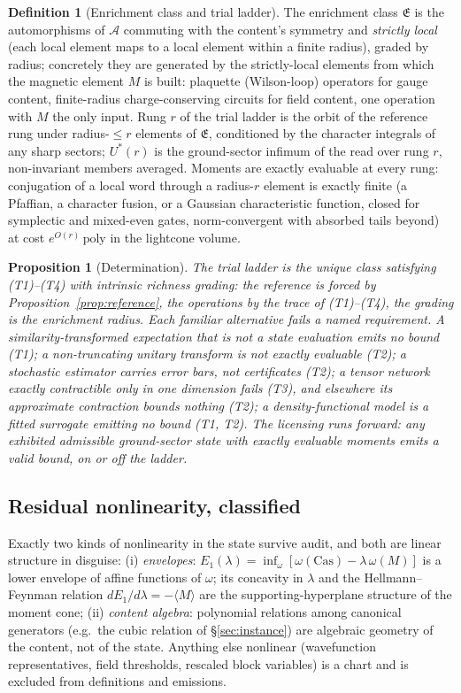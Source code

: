 \documentclass[11pt]{article}
\newtheorem{proposition}[theorem]{Proposition}
\theoremstyle{definition}
\newtheorem{definition}[theorem]{Definition}
\theoremstyle{remark}
\newcommand{\A}{\mathcal{A}}
\begin{document}
\begin{definition}[Enrichment class and trial ladder]\label{def:ladder}
The enrichment class $\mathfrak E$ is the automorphisms of $\A$ commuting
with the content's symmetry and \emph{strictly local} (each local element
maps to a local element within a finite radius), graded by radius;
concretely they are generated by the strictly-local elements from which the
magnetic element $M$ is built: plaquette (Wilson-loop) operators for
gauge content, finite-radius charge-conserving circuits for field content,
one operation with $M$ the only input.  Rung $r$ of the trial ladder is the
orbit of the reference rung under radius-$\le r$ elements of $\mathfrak E$,
conditioned by the character integrals of any sharp sectors; $U^*(r)$ is
the ground-sector infimum of the read over rung $r$, non-invariant members
averaged.  Moments are exactly evaluable at every rung: conjugation of a
local word through a radius-$r$ element is exactly finite (a Pfaffian, a
character fusion, or a Gaussian characteristic function, closed for
symplectic and mixed-even gates, norm-convergent with absorbed tails
beyond) at cost $e^{O(r)}\,\mathrm{poly}$ in the lightcone volume.
\end{definition}

\begin{proposition}[Determination]\label{prop:ladder}
The trial ladder is the unique class satisfying (T1)--(T4) with intrinsic
richness grading: the reference is forced by
Proposition~\ref{prop:reference}, the operations by the trace of
(T1)--(T4), the grading is the enrichment radius.  Each familiar
alternative fails a named requirement.  A similarity-transformed
expectation that is not a state evaluation emits no bound (T1); a
non-truncating unitary transform is not exactly evaluable (T2); a
stochastic estimator carries error bars, not certificates (T2); a tensor
network exactly contractible only in one dimension fails (T3), and
elsewhere its approximate contraction bounds nothing (T2); a
density-functional model is a fitted surrogate emitting no bound (T1, T2).
The licensing runs forward: any exhibited admissible ground-sector state
with exactly evaluable moments emits a valid bound, on or off the ladder.
\end{proposition}

\subsection{Residual nonlinearity, classified}\label{sec:nonlinearity}
Exactly two kinds of nonlinearity in the state survive audit, and both
are linear structure in disguise: (i) \emph{envelopes}: $E_1(\lambda) =
\inf_\omega[\omega(\mathrm{Cas}) - \lambda\,\omega(M)]$ is a lower
envelope of affine functions of $\omega$; its concavity in $\lambda$ and
the Hellmann--Feynman relation $dE_1/d\lambda = -\langle M\rangle$ are
the supporting-hyperplane structure of the moment cone; (ii)
\emph{content algebra}: polynomial relations among canonical generators
(e.g.\ the cubic relation of \S\ref{sec:instance}) are algebraic geometry
of the content, not of the state.  Anything else nonlinear (wavefunction
representatives, field thresholds, rescaled block variables) is a chart
and is excluded from definitions and emissions.
\end{document}
